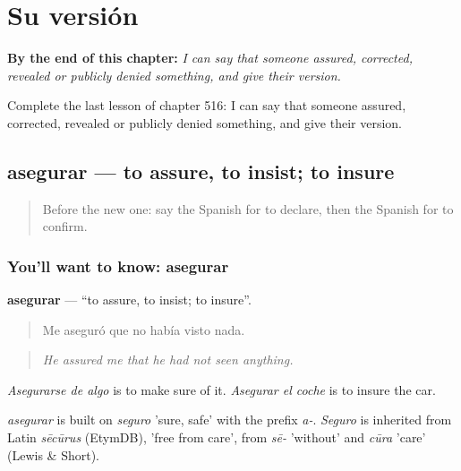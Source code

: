 
\chapter{Su versión}
\label{ch:es-su-version}

\begin{chapteropening}
\textbf{By the end of this chapter:} \emph{I can say that someone assured, corrected, revealed or publicly denied something, and give their version.}

Complete the last lesson of chapter 516: I can say that someone assured, corrected, revealed or publicly denied something, and give their version.
\end{chapteropening}

\section[asegurar]{asegurar — to assure, to insist; to insure}

\label{lesson:ES-C516-asegurar}



\begin{quote}
Before the new one: say the Spanish for to declare, then the Spanish for to confirm.
\end{quote}

\subsection*{You'll want to know: asegurar}
\textbf{asegurar} — \textquotedblleft{}to assure, to insist; to insure\textquotedblright{}.

\begin{quote}
Me aseguró que no había visto nada.
\end{quote}

\begin{quote}
\emph{He assured me that he had not seen anything.}
\end{quote}

\emph{Asegurarse de algo} is to make sure of it. \emph{Asegurar el coche} is to insure the car.

\begin{cousinweb}
\emph{asegurar} is built on \emph{seguro} 'sure, safe' with the prefix \emph{a-}. \emph{Seguro} is inherited from Latin \emph{sēcūrus} (EtymDB), 'free from care', from \emph{sē-} 'without' and \emph{cūra} 'care' (Lewis \& Short).
\end{cousinweb}

